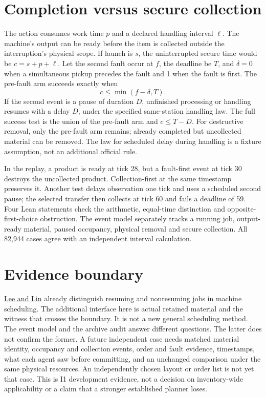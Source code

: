\documentclass[11pt]{article}
\begin{document}
\section{Completion versus secure collection}
The action consumes work time \(p\) and a declared handling interval
\(\ell\). The machine's output can be ready before the item is collected
outside the interruption's physical scope. If launch is \(s\), the
uninterrupted secure time would be \(c=s+p+\ell\). Let the second
fault occur at \(f\), the deadline be \(T\), and \(\delta=0\) when
a simultaneous pickup precedes the fault and 1 when the fault is
first. The pre-fault arm succeeds exactly when
\[
       c\leq\min(f-\delta,T).
\]
If the second event is a pause of duration \(D\), unfinished
processing or handling resumes with a delay \(D\), under the
specified same-station handling law. The full success test is the
union of the pre-fault arm and \(c\leq T-D\). For destructive removal,
only the pre-fault arm remains; already completed but uncollected
material can be removed. The law for scheduled delay during
handling is a fixture assumption, not an additional official rule.

In the replay, a product is ready at tick 28, but a fault-first event
at tick 30 destroys the uncollected product. Collection-first at
the same timestamp preserves it. Another test delays observation
one tick and uses a scheduled second pause; the selected transfer
then collects at tick 60 and fails a deadline of 59. Four Lean
statements check the arithmetic, equal-time distinction and
opposite-first-choice obstruction. The event model separately
tracks a running job, output-ready material, paused occupancy,
physical removal and secure collection. All 82,944 cases agree
with an independent interval calculation.

\section{Evidence boundary}
\href{https://doi.org/10.1016/S0377-2217(00)00322-2}{Lee and Lin}
already distinguish resuming and nonresuming jobs in machine
scheduling. The additional interface here is actual retained
material and the witness that crosses the boundary. It is not
a new general scheduling method. The event model and the archive
audit answer different questions. The latter does not confirm
the former. A future independent case needs matched material identity,
occupancy and collection events, order and fault evidence,
timestamps, what each agent saw before committing, and an unchanged
comparison under the same physical resources. An independently
chosen layout or order list is not yet that case. This is I1
development evidence, not a decision on inventory-wide applicability
or a claim that a stronger established planner loses.
\end{document}
